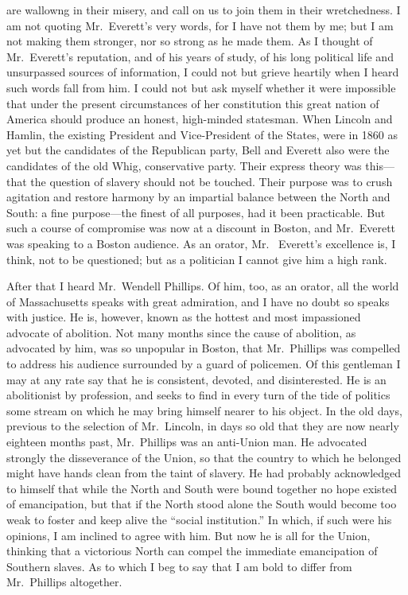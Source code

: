 are wallowng in their misery, and call on us to join them in their
wretchedness.  I am not quoting Mr.\ Everett's very words, for I
have not them by me; but I am not making them stronger, nor so
strong as he made them.  As I thought of Mr.\ Everett's reputation,
and of his years of study, of his long political life and
unsurpassed sources of information, I could not but grieve heartily
when I heard such words fall from him.  I could not but ask myself
whether it were impossible that under the present circumstances of
her constitution this great nation of America should produce an
honest, high-minded statesman.  When Lincoln and Hamlin, the
existing President and Vice-President of the States, were in 1860
as yet but the candidates of the Republican party, Bell and Everett
also were the candidates of the old Whig, conservative party.
Their express theory was this---that the question of slavery should
not be touched.  Their purpose was to crush agitation and restore
harmony by an impartial balance between the North and South: a fine
purpose---the finest of all purposes, had it been practicable.  But
such a course of compromise was now at a discount in Boston, and
Mr.\ Everett was speaking to a Boston audience.  As an orator, Mr.\ %
Everett's excellence is, I think, not to be questioned; but as a
politician I cannot give him a high rank.

After that I heard Mr.\ Wendell Phillips.  Of him, too, as an
orator, all the world of Massachusetts speaks with great
admiration, and I have no doubt so speaks with justice.  He is,
however, known as the hottest and most impassioned advocate of
abolition.  Not many months since the cause of abolition, as
advocated by him, was so unpopular in Boston, that Mr.\ Phillips was
compelled to address his audience surrounded by a guard of
policemen.  Of this gentleman I may at any rate say that he is
consistent, devoted, and disinterested.  He is an abolitionist by
profession, and seeks to find in every turn of the tide of politics
some stream on which he may bring himself nearer to his object.  In
the old days, previous to the selection of Mr.\ Lincoln, in days so
old that they are now nearly eighteen months past, Mr.\ Phillips was
an anti-Union man.  He advocated strongly the disseverance of the
Union, so that the country to which he belonged might have hands
clean from the taint of slavery.  He had probably acknowledged to
himself that while the North and South were bound together no hope
existed of emancipation, but that if the North stood alone the
South would become too weak to foster and keep alive the ``social
institution.''  In which, if such were his opinions, I am inclined
to agree with him.  But now he is all for the Union, thinking that
a victorious North can compel the immediate emancipation of
Southern slaves.  As to which I beg to say that I am bold to differ
from Mr.\ Phillips altogether.


